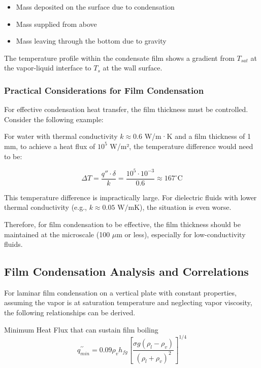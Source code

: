 \begin{itemize}
    \item Mass deposited on the surface due to condensation
    \item Mass supplied from above
    \item Mass leaving through the bottom due to gravity
\end{itemize}

The temperature profile within the condensate film shows a gradient from $T_{sat}$ at the vapor-liquid interface to $T_s$ at the wall surface.
\subsubsection*{Practical Considerations for Film Condensation}
For effective condensation heat transfer, the film thickness must be controlled. Consider the following example:

For water with thermal conductivity $k \approx 0.6$ W/m·K and a film thickness of 1 mm, to achieve a heat flux of $10^5$ W/m², the temperature difference would need to be:

\[
    \Delta T = \frac{q'' \cdot \delta}{k} = \frac{10^5 \cdot 10^{-3}}{0.6} \approx 167^\circ \mathrm{C}
\]

This temperature difference is impractically large. For dielectric fluids with lower thermal conductivity (e.g., $k \approx 0.05$ $\mathrm{W/mK}$), the situation is even worse.

Therefore, for film condensation to be effective, the film thickness should be maintained at the microscale (100 $\mu$m or less), especially for low-conductivity fluids.
\subsection*{Film Condensation Analysis and Correlations}
For laminar film condensation on a vertical plate with constant properties, assuming the vapor is at saturation temperature and neglecting vapor viscosity, the following relationships can be derived.

\begin{definition}
    Minimum Heat Flux that can sustain film boiling
    \[
    q_{m i n}^{\prime \prime}=0.09 \rho_v h_{f g}\left[\frac{\sigma g\left(\rho_l-\rho_v\right)}{\left(\rho_l+\rho_v\right)^2}\right]^{1 / 4}
    \]
\end{definition}

